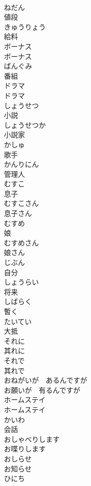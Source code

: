 \documentclass[8pt]{extreport}
\begin{document}
\begin{CJK}{UTF8}{min}
\\	ねだん	
\\	値段		
\\	きゅうりょう	
\\	給料	
\\	ボーナス	
\\	ボーナス		
\\	ばんぐみ	
\\	番組		
\\	ドラマ	
\\	ドラマ		
\\	しょうせつ	
\\	小説		
\\	しょうせつか	
\\	小説家		
\\	かしゅ	
\\	歌手		
\\	かんりにん	
\\	管理人		
\\	むすこ	
\\	息子		
\\	むすこさん	
\\	息子さん		
\\	むすめ	
\\	娘		
\\	むすめさん	
\\	娘さん		
\\	じぶん	
\\	自分	
\\	しょうらい	
\\	将来	
\\	しばらく	
\\	暫く		
\\	たいてい	
\\	大抵		
\\	それに	
\\	其れに		
\\	それで	
\\	其れで		
\\	おねがいが　あるんですが	
\\	お願いが　有るんですが		
\\	ホームステイ	
\\	ホームステイ		
\\	かいわ	
\\	会話		
\\	おしゃべりします	
\\	お喋りします		
\\	おしらせ	
\\	お知らせ		
\\	ひにち	

\end{CJK}
\end{document}
